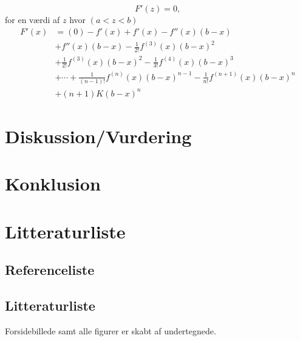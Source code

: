\documentclass[12pt, a4paper]{article}
\begin{document}
\begin{refsection}
\begin{equation}
    F'(z)=0,
\end{equation}
for en værdi af $z$ hvor $(a<z<b)$
\begin{equation}
    \begin{aligned}
        F'(x) &=(0) -f'(x)+f'(x)-f''(x)(b-x)\\
              &+f''(x)(b-x)-\frac{1}{2!}f^{(3)}(x)(b-x)^2\\
              &+\frac{1}{2!}f^{(3)}(x)(b-x)^2-\frac{1}{3!}f^{(4)}(x)(b-x)^3\\
              &+\cdots + \frac{1}{(n-1)!}f^{(n)}(x)(b-x)^{n-1}-\frac{1}{n!}f^{(n+1)}(x)(b-x)^n\\
              &+(n+1)K(b-x)^n
    \end{aligned}
\end{equation}
\section{Diskussion/Vurdering} %
\section{Konklusion} %
\newpage
\section{Litteraturliste}
\subsection{Referenceliste}
\printbibliography[title=Cited]
\end{refsection}
\subsection{Litteraturliste}
\nocite{*}
\printbibliography
Forsidebillede samt alle figurer er skabt af undertegnede.
\end{document}
